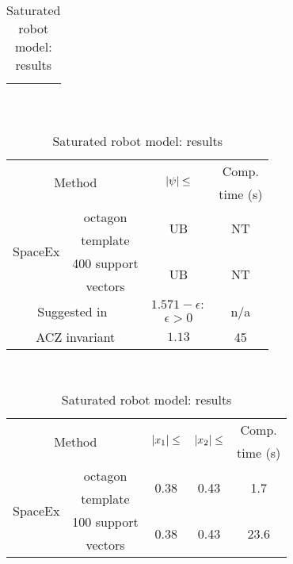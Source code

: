 \begin{table}
\begin{minipage}{0.48\textwidth}
\begin{tabular}{|l|c|c|c|}
\multicolumn{2}{|c|}{} & & \\
\hline
\end{tabular}
\caption{Unsaturated robot model: results}
\vspace{-0.5em}
~\label{tab:robot-unsaturated}
\end{minipage}
\hspace{0em}
\begin{minipage}{0.48\textwidth}
\centering
\begin{tabular}{|l|c|c|c|}
\hline
\multicolumn{2}{|c|}{\multirow{2}{*}{Method}} &
\multirow{2}{*}{$\left|\psi\right|\leq$} & Comp.\\
\multicolumn{2}{|c|}{} & & time (s)\\
\hline
\multirow{4}{*}{SpaceEx} & octagon & \multirow{2}{*}{UB} &
\multirow{2}{*}{NT}\\
& template & & \\
\cline{2-4}
& 400 support & \multirow{2}{*}{UB} & \multirow{2}{*}{NT}\\
& vectors & & \\
\hline
\multicolumn{2}{|c|}{\multirow{2}{*}{Suggested in~\cite{heinz2014benchmark}}} &
$1.571-\epsilon:$ & \multirow{2}{*}{n/a}\\
\multicolumn{2}{|c|}{} & $\epsilon>0$ &\\
\hline
\multicolumn{2}{|c|}{\multirow{2}{*}{ACZ invariant}} & \multirow{2}{*}{$1.13$} &
\multirow{2}{*}{45}\\
\multicolumn{2}{|c|}{} & &\\
\hline
\end{tabular}
\caption{Saturated robot model: results}
~\label{tab:robot-saturated}
\vspace{-0.5em}
\end{minipage}
\begin{minipage}{0.45\textwidth}
\begin{tabular}{|l|c|c|c|c|}
\hline
\multicolumn{2}{|c|}{\multirow{2}{*}{Method}} &
\multirow{2}{*}{$\left|x_1\right|\leq$} & \multirow{2}{*}{$\left|x_2\right|\leq$} & Comp.\\
\multicolumn{2}{|c|}{} & & & time (s) \\
\hline
\multirow{4}{*}{SpaceEx} & octagon & \multirow{2}{*}{0.38} &
\multirow{2}{*}{0.43} & \multirow{2}{*}{1.7}\\
& template & & &\\
\cline{2-5}
& 100 support & \multirow{2}{*}{0.38} & \multirow{2}{*}{0.43} & \multirow{2}{*}{23.6}\\
& vectors & & &\\

\end{tabular}
\end{minipage}
\end{table}
